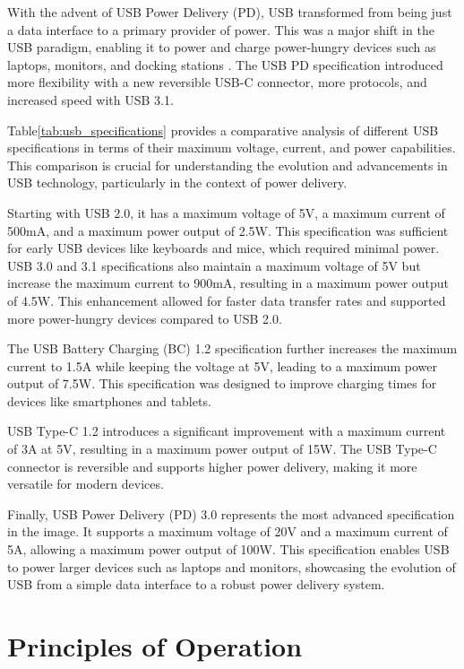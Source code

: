 With the advent of USB Power Delivery (PD), USB transformed from being just a data interface to a primary provider of power. This was a major shift in the USB paradigm, enabling it to power and charge power-hungry devices such as laptops, monitors, and docking stations \cite{Truechip2024}. The USB PD specification introduced more flexibility with a new reversible USB-C connector, more protocols, and increased speed with USB 3.1.

Table\ref{tab:usb_specifications} provides a comparative analysis of different USB specifications in terms of their maximum voltage, current, and power capabilities. This comparison is crucial for understanding the evolution and advancements in USB technology, particularly in the context of power delivery.

Starting with USB 2.0, it has a maximum voltage of 5V, a maximum current of 500mA, and a maximum power output of 2.5W. This specification was sufficient for early USB devices like keyboards and mice, which required minimal power. USB 3.0 and 3.1 specifications also maintain a maximum voltage of 5V but increase the maximum current to 900mA, resulting in a maximum power output of 4.5W. This enhancement allowed for faster data transfer rates and supported more power-hungry devices compared to USB 2.0.

The USB Battery Charging (BC) 1.2 specification further increases the maximum current to 1.5A while keeping the voltage at 5V, leading to a maximum power output of 7.5W. This specification was designed to improve charging times for devices like smartphones and tablets.

USB Type-C 1.2 introduces a significant improvement with a maximum current of 3A at 5V, resulting in a maximum power output of 15W. The USB Type-C connector is reversible and supports higher power delivery, making it more versatile for modern devices.

Finally, USB Power Delivery (PD) 3.0 represents the most advanced specification in the image. It supports a maximum voltage of 20V and a maximum current of 5A, allowing a maximum power output of 100W. This specification enables USB to power larger devices such as laptops and monitors, showcasing the evolution of USB from a simple data interface to a robust power delivery system.

\section{Principles of Operation}
